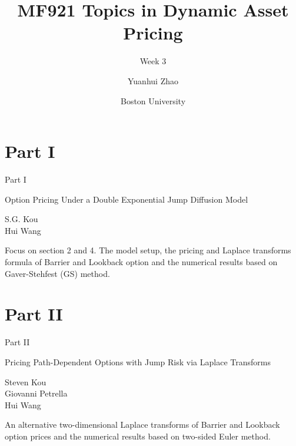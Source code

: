 \documentclass{beamer}
\title{MF921 Topics in Dynamic Asset Pricing}
\subtitle{Week 3}
\author{Yuanhui Zhao}
\date{Boston University}
\begin{document}
\frame{\titlepage}
\section{Part I}
\begin{frame}{Part I}
    \begin{center}
        Option Pricing Under a Double Exponential Jump Diffusion Model
    \end{center}
    \vspace{2em}
    \begin{center}
        S.G. Kou\\
        Hui Wang
    \end{center}
    \vspace{3em}
    \par Focus on section 2 and 4. The model setup, the pricing and Laplace transforms formula of Barrier 
    and Lookback option and the numerical results based on Gaver-Stehfest (GS) method.
 \end{frame}

 \section{Part II}
\begin{frame}{Part II}

    \begin{center}
        Pricing Path-Dependent Options with Jump Risk via Laplace Transforms
    \end{center}
    \vspace{2em}
    \begin{center}
        Steven Kou\\
        Giovanni Petrella\\
        Hui Wang
    \end{center}
    \vspace{3em}
    \par  An alternative two-dimensional Laplace transforms of Barrier and Lookback option prices
    and the numerical results based on two-sided Euler method.
    
\end{frame}
\end{document}
